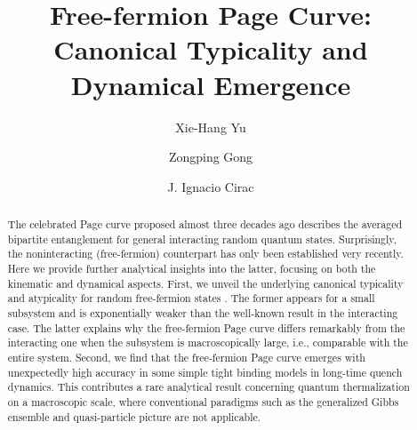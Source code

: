 \documentclass[twocolumn,english,prl,aps,superscriptaddress,amsmath,amssymb,floatfix]{revtex4-2}
\begin{document}
\title{Free-fermion %
Page Curve: Canonical Typicality and Dynamical Emergence}
\author{Xie-Hang Yu}
\author{Zongping Gong}
\author{J. Ignacio Cirac}
\begin{abstract}
The celebrated Page curve proposed almost three decades ago describes the averaged bipartite entanglement for general interacting random quantum states. Surprisingly, the noninteracting (free-fermion) counterpart has only been established very recently. %
Here we provide further analytical insights into the latter, focusing on both the kinematic and dynamical aspects. First, we unveil the underlying canonical typicality and atypicality for random free-fermion states%
. The former appears for a small subsystem and is exponentially weaker than the well-known result in the interacting case. The latter explains why the free-fermion Page curve differs remarkably from the interacting one when the subsystem is macroscopically large, i.e., comparable with the entire system. Second, we find that the free-fermion Page curve emerges with unexpectedly high accuracy in some simple tight binding %
models in long-time quench dynamics. This contributes a rare analytical result concerning quantum thermalization on a macroscopic scale, where conventional paradigms such as the generalized Gibbs ensemble and quasi-particle picture are not applicable. %
\begin{comment}
The random fermionic Gaussian(RFG-) ensemble is %
\textcolor{red}{widely used} %
to illustrate many physical concepts, such as thermalization and entanglement
entropy. Our work first studies the ergodicity of these ensemble and
prove the canonical typicality. We found that the thermalization rate
of the free Fermonic systems is only polynomial in environment size,
rather than exponential. This slower convergence rate can predict
very different local behavior of EE for RFG-ensemble.
Later, we turn to some global behavior such as Page curve of the RFG-ensemble.
Our work suggests that the Page curve can dynamically emerge with
a class of time independent, translationally symmetric Hamiltonians.
We analytically give a full description of this class of Hamiltonians.
We also pointed out the original method of calculating free-fermionic
dynamical entropy in quasi-particle picture can only give a lower
bound, because this picture ignores correlations among multiple pairs
generated simultaneously. 
\end{comment}
\end{abstract}
\end{document}
